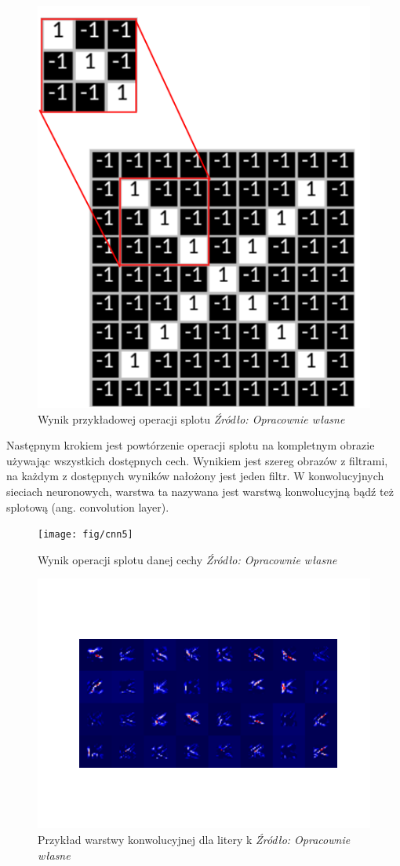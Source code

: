 \documentclass[brudnopis]{xmgr}
\begin{document}
\begin{figure}[!tbh]
\centering
\includegraphics[width=.5\hsize]{fig/cnn4}
\caption{Wynik przykładowej operacji splotu \emph{Źródło: Opracownie własne}}
\end{figure}

Następnym krokiem jest powtórzenie operacji splotu na kompletnym obrazie używając wszystkich dostępnych cech. Wynikiem jest szereg obrazów z filtrami, na każdym z dostępnych wyników nałożony jest jeden filtr. W konwolucyjnych sieciach neuronowych, warstwa ta nazywana jest warstwą konwolucyjną bądź też splotową (ang. convolution layer).

\begin{figure}[!tbh]
\centering
\texttt{[image: fig/cnn5]}
\caption{Wynik operacji splotu danej cechy \emph{Źródło: Opracownie własne}}
\end{figure}
\newpage


\begin{figure}[!tbh]
\centering
\includegraphics[width=.7\hsize]{fig/figure_1}
\caption{Przykład warstwy konwolucyjnej dla litery k \emph{Źródło: Opracownie własne}}
\end{figure}
\end{document}
